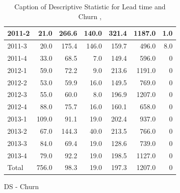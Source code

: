 \documentclass[UKenglish]{ifimaster}  %
\begin{document}
\begin{appendices}
\begin{table}[!htbp]
\begin{adjustwidth}{-1.5cm}{}
\begin{subfigure}[b]{0.3\textwidth}
{\begin{tabular}{ | l | r | r | r | r | r | r | }
2011-2 & 21.0 & 266.6 & 140.0 & 321.4 & 1187.0 & 1.0\\ \hline
2011-3 & 20.0 & 175.4 & 146.0 & 159.7 & 496.0 & 8.0\\ \hline
2011-4 & 33.0 & 68.5 & 7.0 & 149.4 & 596.0 & 0\\ \hline
2012-1 & 59.0 & 72.2 & 9.0 & 213.6 & 1191.0 & 0\\ \hline
2012-2 & 53.0 & 59.9 & 16.0 & 149.5 & 769.0 & 0\\ \hline
2012-3 & 55.0 & 60.0 & 8.0 & 196.9 & 1207.0 & 0\\ \hline
2012-4 & 88.0 & 75.7 & 16.0 & 160.1 & 658.0 & 0\\ \hline
2013-1 & 109.0 & 91.1 & 19.0 & 202.4 & 937.0 & 0\\ \hline
2013-2 & 67.0 & 144.3 & 40.0 & 213.5 & 766.0 & 0\\ \hline
2013-3 & 84.0 & 69.4 & 19.0 & 128.6 & 739.0 & 0\\ \hline
2013-4 & 79.0 & 92.2 & 19.0 & 198.5 & 1127.0 & 0\\ \hline
Total & 756.0 & 98.3 & 19.0 & 197.3 & 1207.0 & 0\\ \hline

\end{tabular}
}
\caption{DS - Churn}
 \label{DS:Churn:6}
\end{subfigure}
\end{adjustwidth}
\caption[Optional caption for list of figures]{Caption of Descriptive Statistic for Lead time and Churn  , }
\label{DS:6:3}
\end{table}


\end{appendices}
\end{document}
